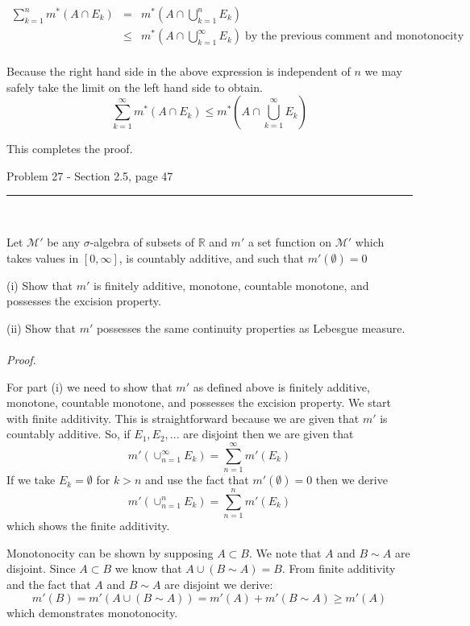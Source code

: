 \documentclass[11pt,reqno]{article}
\begin{document}
\begin{eqnarray*} 
\sum_{k=1}^n m^*(A \cap E_k) &=& m^*(A \cap \bigcup_{k=1}^n E_k) \\
&\le& m^*(A \cap \bigcup_{k=1}^\infty E_k) \; \text{by the previous comment and monotonocity} \\
\end{eqnarray*}

Because the right hand side in the above expression is independent of $n$ we may safely take the limit on the left hand side to obtain.
\[ \sum_{k=1}^\infty m^*(A \cap E_k) \le m^*(A \cap \bigcup_{k=1}^\infty E_k) \]

\noindent This completes the proof.

\begin{flushleft} 
Problem 27 - Section 2.5, page 47\\
\rule{500pt}{1pt}\\
\end{flushleft} 

Let $\mathcal{M}'$ be any $\sigma$-algebra of subsets of $\mathbb{R}$ and $m'$ a set function on $\mathcal{M}'$ which takes values in $[0,\infty]$, is countably additive, and such that $m'(\emptyset) = 0$

\noindent (i)  Show that $m'$ is finitely additive, monotone, countable monotone, and possesses the excision property.

\noindent (ii) Show that $m'$ possesses the same continuity properties as Lebesgue measure.
\\\\ \emph{Proof.}

For part (i) we need to show that $m'$ as defined above is finitely additive, monotone, countable monotone, and possesses the excision property.
We start with finite additivity. This is straightforward because we are given that $m'$ is countably additive. So, if $E_1, E_2, ...$ are disjoint then we are given that 
\[ m'(\cup_{n = 1}^\infty E_k) = \sum_{n =1}^\infty m'(E_k) \]
If we take $E_k = \emptyset$ for $k > n$ and use the fact that $m'(\emptyset) = 0$ then we derive
\[ m'(\cup_{n = 1}^n E_k) = \sum_{n =1}^n m'(E_k) \]
which shows the finite additivity.

Monotonocity can be shown by supposing $A \subset B$. We note that $A$ and $B \sim A$ are disjoint. Since $A \subset B$ we know that $A \cup (B \sim A) = B$. From finite additivity and the fact that $A$ and $B \sim A$ are disjoint we derive:
\[ m'(B) = m'(A \cup (B \sim A)) = m'(A) + m'(B \sim A) \ge m'(A) \]
which demonstrates monotonocity.
\end{document}
